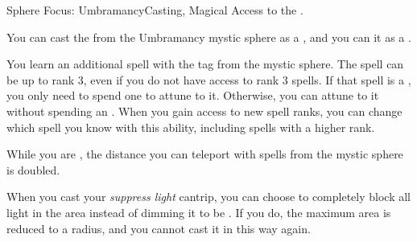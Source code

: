     \begin{magicalfeat}{Sphere Focus: Umbramancy}{Casting, Magical}
        \featpre Access to the  .

         You can cast the   from the Umbramancy mystic sphere as a , and you can  it as a .

         You learn an additional spell with the  tag from the  mystic sphere.
        The spell can be up to rank 3, even if you do not have access to rank 3 spells.
        If that spell is a , you only need to spend one  to attune to it.
        Otherwise, you can attune to it without spending an .
        When you gain access to new spell ranks, you can change which spell you know with this ability, including spells with a higher rank.

         While you are , the distance you can teleport with spells from the  mystic sphere is doubled.

         When you cast your \textit{suppress light} cantrip, you can choose to completely block all light in the area instead of dimming it to be .
        If you do, the maximum area is reduced to a \medarea radius, and you  cannot cast it in this way again.
    \end{magicalfeat}

